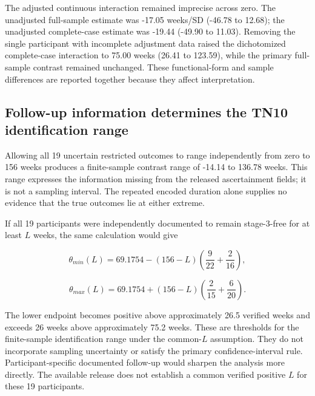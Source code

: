 \documentclass[
  american,
  11pt,
  letterpaper,
]{article}
\begin{document}
The adjusted continuous interaction remained imprecise across zero. The
unadjusted full-sample estimate was \mbox{-17.05} weeks/SD (\mbox{-46.78} to 12.68);
the unadjusted complete-case estimate was \mbox{-19.44} (\mbox{-49.90} to 11.03).
Removing the single participant with incomplete adjustment data raised
the dichotomized complete-case interaction to 75.00 weeks (26.41 to
123.59), while the primary full-sample contrast remained unchanged.
These functional-form and sample differences are reported together
because they affect interpretation.

\subsection{Follow-up information determines the TN10 identification
range}\label{follow-up-information-determines-the-tn10-identification-range}

Allowing all 19 uncertain restricted outcomes to range independently
from zero to 156 weeks produces a finite-sample contrast range of \mbox{-14.14}
to 136.78 weeks. This range expresses the information missing from the
released ascertainment fields; it is not a sampling interval. The
repeated encoded duration alone supplies no evidence that the true
outcomes lie at either extreme.

If all 19 participants were independently documented to remain
stage-3-free for at least \(L\) weeks, the same calculation would give

\begin{samepage}
\[
\theta_{min}(L)=69.1754-(156-L)\left(\frac{9}{22}+\frac{2}{16}\right),
\]

\[
\theta_{max}(L)=69.1754+(156-L)\left(\frac{2}{15}+\frac{6}{20}\right).
\]
\end{samepage}

The lower endpoint becomes positive above approximately 26.5 verified
weeks and exceeds 26 weeks above approximately 75.2 weeks. These are
thresholds for the finite-sample identification range under the
common-\(L\) assumption. They do not incorporate sampling uncertainty or
satisfy the primary confidence-interval rule. Participant-specific
documented follow-up would sharpen the analysis more directly. The
available release does not establish a common verified positive \(L\)
for these 19 participants.
\end{document}
